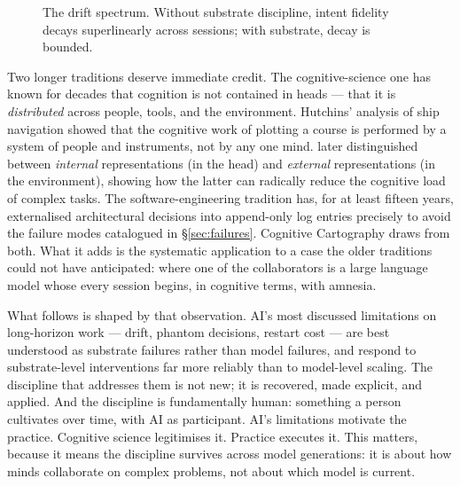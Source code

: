 \documentclass[11pt,a4paper,twocolumn]{article}
\begin{document}
\begin{figure}[t]
\centering
{}
\caption{The drift spectrum. Without substrate discipline, intent
fidelity decays superlinearly across sessions; with substrate,
decay is bounded.}
\label{fig:drift}
\end{figure}

Two longer traditions deserve immediate credit. The cognitive-science
one has known for decades that cognition is not contained in heads
--- that it is \emph{distributed} across people, tools, and the
environment. Hutchins' analysis of ship navigation \citep{hutchins1995}
showed that the cognitive work of plotting a course is performed by a
system of people and instruments, not by any one mind.
\citet{scaife1996external} later distinguished between
\emph{internal} representations (in the head) and \emph{external}
representations (in the environment), showing how the latter can
radically reduce the cognitive load of complex tasks. The
software-engineering tradition has, for at least fifteen years,
externalised architectural decisions into append-only log entries
\citep{nygard2011adr} precisely to avoid the failure modes
catalogued in \S\ref{sec:failures}. Cognitive Cartography draws from
both. What it adds is the systematic application to a case the older
traditions could not have anticipated: where one of the
collaborators is a large language model whose every session begins,
in cognitive terms, with amnesia.

What follows is shaped by that observation. AI's most discussed
limitations on long-horizon work --- drift, phantom decisions,
restart cost --- are best understood as substrate failures rather
than model failures, and respond to substrate-level interventions
far more reliably than to model-level scaling. The discipline that
addresses them is not new; it is recovered, made explicit, and
applied. And the discipline is fundamentally human: something a
person cultivates over time, with AI as participant. AI's
limitations motivate the practice. Cognitive science legitimises
it. Practice executes it. This matters, because it means the
discipline survives across model generations: it is about how minds
collaborate on complex problems, not about which model is current.
\end{document}
